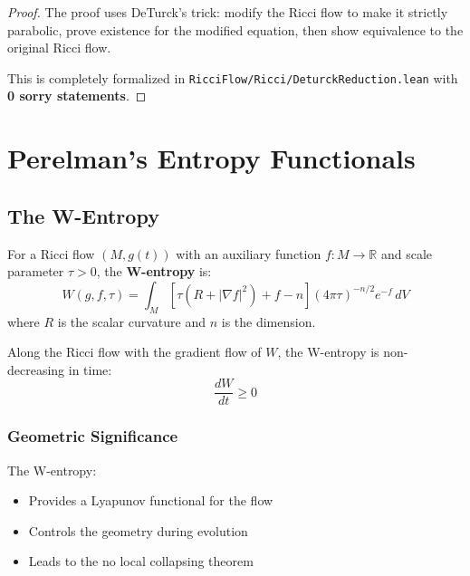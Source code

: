 \begin{proof}
The proof uses DeTurck's trick: modify the Ricci flow to make it strictly parabolic, prove existence for the modified equation, then show equivalence to the original Ricci flow.

This is completely formalized in \texttt{RicciFlow/Ricci/DeturckReduction.lean} with \textbf{0 sorry statements}.
\end{proof}

\chapter{Perelman's Entropy Functionals}
\label{chap:entropy}

\section{The W-Entropy}

\begin{definition}[W-Entropy]
\label{def:w_entropy}
\leanok
{}
For a Ricci flow $(M, g(t))$ with an auxiliary function $f : M \to \mathbb{R}$ and scale parameter $\tau > 0$, the \textbf{W-entropy} is:
\[
W(g, f, \tau) = \int_M \left[\tau(R + |\nabla f|^2) + f - n\right] (4\pi\tau)^{-n/2} e^{-f} \, dV
\]
where $R$ is the scalar curvature and $n$ is the dimension.
\end{definition}

\begin{theorem}
\label{thm:w_entropy_monotone}
\leanok
{}
Along the Ricci flow with the gradient flow of $W$, the W-entropy is non-decreasing in time:
\[
\frac{dW}{dt} \geq 0
\]
\end{theorem}

\subsection{Geometric Significance}

The W-entropy:
\begin{itemize}
\item Provides a Lyapunov functional for the flow
\item Controls the geometry during evolution
\item Leads to the no local collapsing theorem
\end{itemize}

